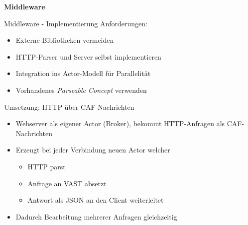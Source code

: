 \documentclass[9pt]{beamer}
\begin{document}
	\begin{frame}{}
		\begin{center}
			\LARGE \textbf{Middleware}
		\end{center}
	\end{frame}

\begin{frame}{Middleware - Implementierung}{}
	Anforderungen:
	\begin{itemize}
		\item Externe Bibliotheken vermeiden
		\item HTTP-Parser und Server selbst implementieren
		\item Integration ins Actor-Modell für Parallelität
		\item Vorhandenes \emph{Parseable Concept} verwenden
	\end{itemize}
	Umsetzung: HTTP über CAF-Nachrichten
	\begin{itemize}
        \item Webserver als eigener Actor (Broker), bekommt HTTP-Anfragen als CAF-Nachrichten
		\item Erzeugt bei jeder Verbindung neuen Actor welcher
            \begin{itemize}
                \item HTTP parst
                \item Anfrage an VAST absetzt
                \item Antwort als JSON an den Client weiterleitet
            \end{itemize}
		\item Dadurch Bearbeitung mehrerer Anfragen gleichzeitig
	\end{itemize}
\end{frame}
\end{document}

